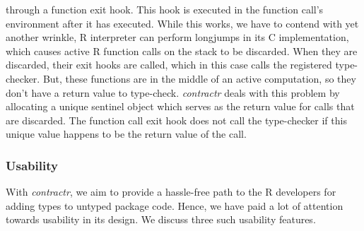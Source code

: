 \documentclass[acmsmall,review,anonymous]{acmart}\settopmatter{printfolios=true,printccs=false,printacmref=false}
\newcommand{\contractr}{\emph{contractr}\xspace} %
\begin{document}
\begin{itemize}
  through a function exit hook. This hook is executed in the function call's
  environment after it has executed. While this works, we have to contend with yet
  another wrinkle, R interpreter can perform longjumps in its C implementation,
  which causes active R function calls on the stack to be discarded. When they are
  discarded, their exit hooks are called, which in this case calls the registered
  type-checker. But, these functions are in the middle of an active computation,
  so they don't have a return value to type-check. \contractr deals with
  this problem by allocating a unique sentinel object which serves as the return
  value for calls that are discarded. The function call exit hook does not call
  the type-checker if this unique value happens to be the return value of the
  call.
\end{itemize}
%
%
\subsubsection{Usability}
With \contractr, we aim to provide a hassle-free path to the R developers for
adding types to untyped package code. Hence, we have paid a lot of attention
towards usability in its design. We discuss three such usability features.
\end{document}
